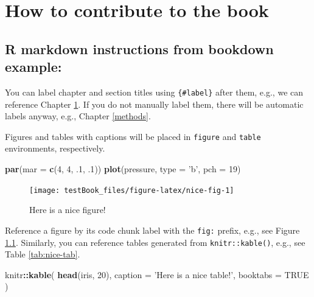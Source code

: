 \documentclass[
]{book}
\newenvironment{Shaded}{\begin{snugshade}}{\end{snugshade}}
\newcommand{\DataTypeTok}[1]{\textcolor[rgb]{0.13,0.29,0.53}{#1}}
\newcommand{\DecValTok}[1]{\textcolor[rgb]{0.00,0.00,0.81}{#1}}
\newcommand{\FloatTok}[1]{\textcolor[rgb]{0.00,0.00,0.81}{#1}}
\newcommand{\KeywordTok}[1]{\textcolor[rgb]{0.13,0.29,0.53}{\textbf{#1}}}
\newcommand{\NormalTok}[1]{#1}
\newcommand{\OperatorTok}[1]{\textcolor[rgb]{0.81,0.36,0.00}{\textbf{#1}}}
\newcommand{\OtherTok}[1]{\textcolor[rgb]{0.56,0.35,0.01}{#1}}
\newcommand{\StringTok}[1]{\textcolor[rgb]{0.31,0.60,0.02}{#1}}
\begin{document}
\hypertarget{intro}{%
\chapter{How to contribute to the book}\label{intro}}

\hypertarget{r-markdown-instructions-from-bookdown-example}{%
\section{R markdown instructions from bookdown example:}\label{r-markdown-instructions-from-bookdown-example}}

You can label chapter and section titles using \texttt{\{\#label\}} after them, e.g., we can reference Chapter \ref{intro}. If you do not manually label them, there will be automatic labels anyway, e.g., Chapter \ref{methods}.

Figures and tables with captions will be placed in \texttt{figure} and \texttt{table} environments, respectively.

\begin{Shaded}
\begin{Highlighting}[]
\KeywordTok{par}\NormalTok{(}\DataTypeTok{mar =} \KeywordTok{c}\NormalTok{(}\DecValTok{4}\NormalTok{, }\DecValTok{4}\NormalTok{, }\FloatTok{.1}\NormalTok{, }\FloatTok{.1}\NormalTok{))}
\KeywordTok{plot}\NormalTok{(pressure, }\DataTypeTok{type =} \StringTok{'b'}\NormalTok{, }\DataTypeTok{pch =} \DecValTok{19}\NormalTok{)}
\end{Highlighting}
\end{Shaded}

\begin{figure}

{\centering \texttt{[image: testBook\_files/figure-latex/nice-fig-1]} 

}

\caption{Here is a nice figure!}\label{fig:nice-fig}
\end{figure}

Reference a figure by its code chunk label with the \texttt{fig:} prefix, e.g., see Figure \ref{fig:nice-fig}. Similarly, you can reference tables generated from \texttt{knitr::kable()}, e.g., see Table \ref{tab:nice-tab}.

\begin{Shaded}
\begin{Highlighting}[]
\NormalTok{knitr}\OperatorTok{::}\KeywordTok{kable}\NormalTok{(}
  \KeywordTok{head}\NormalTok{(iris, }\DecValTok{20}\NormalTok{), }\DataTypeTok{caption =} \StringTok{'Here is a nice table!'}\NormalTok{,}
  \DataTypeTok{booktabs =} \OtherTok{TRUE}
\NormalTok{)}
\end{Highlighting}
\end{Shaded}
\end{document}
